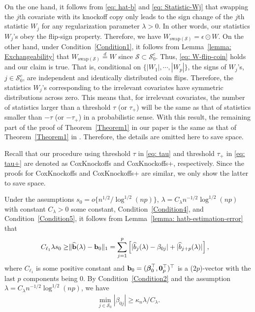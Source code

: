 \documentclass[11pt]{article}
\def\bb{{\bf b}}
\def\0{{\bf 0}}
\newcommand{\bbeta}{\mbox{\boldmath $\beta$}}
\begin{document}
On the one hand, it follows from \eqref{eq: hat-b} and \eqref{eq: Statistic-Wj} that swapping the $j$th covariate with its knockoff copy only leads to the sign change of the $j$th statistic $W_j$ for any regularization parameter $\lambda>0$. In other words, our statistics $W_j$'s obey the flip-sign property. Therefore, we have $ W_{\mathrm{swap}(\mathcal{S})}=\epsilon \odot W$. On the other hand, under Condition~\ref{Condition1},  it follows from Lemma~\ref{lemma: Exchangeability} that $W_{\mathrm{swap}(\mathcal{S})} \overset{d}= W$ since $\mathcal{S}\subset \mathcal{S}_{0}^c$. Thus, \eqref{eq: W-flip-coin} holds and our claim is true. That is, conditional on $\{|W_1|, \cdots, |W_p|\}$,  the signs of $W_j$'s, $j\in \mathcal{S}_0^c$, are independent and identically distributed coin flips. Therefore, the statistics $W_j$'s corresponding to the irrelevant covariates have symmetric distributions across zero. This means that, for irrelevant covariates, the number of statistics larger than a threshold $\tau$ (or $\tau_{+}$) will be the same as that of statistics smaller than $-\tau$ (or $-\tau_{+}$) in a probabilistic sense. With this result, the remaining part of the proof of Theorem~\ref{Theorem1} in our paper is the same as that of Theorem~\ref{Theorem1} in \cite{candes2018panning}. Therefore, the details are omitted here to save space.



\vspace{8mm}
Recall that our procedure
using threshold $\tau$ in \eqref{eq: tau} and threshold $\tau_{+}$ in \eqref{eq: tau+} are denoted as CoxKnockoffs and CoxKnockoffs+, respectively.  Since the proofs for CoxKnockoffs and CoxKnockoffs+ are similar,  we only show the latter to save space. 

Under the assumptions  $s_0=o\{n^{1/2}/\log^{1/2}(np)\}$,  $\lambda=C_{\lambda}n^{-1/2}\log^{1/2}(np)$ with constant $C_{\lambda}>0$ some constant,  Condition~\ref{Condition4}, and Condition~\ref{Condition5}, it follows from Lemma~\ref{lemma: hatb-estimation-error} that 
\begin{align}\label{eq: oracle-inequality-beta} 
C_{\ell_1}\lambda s_0
\geq & \|\widehat{\bb}(\lambda)-\bb_0\|_1
=\sum_{j=1}^p\left[|\widehat{b}_j(\lambda)-\beta_{0j}|+ |\widehat{b}_{j+p}(\lambda)|\right],
\end{align}    
where $C_{\ell_1}$ is some positive constant %
and $\bb_0=(\bbeta_0^{\top}, \0_p^{\top})^{\top}$ is a ($2p$)-vector with the last $p$ components being 0. By Condition~\ref{Condition2} and the assumption  
$\lambda=C_{\lambda}n^{-1/2}\log^{1/2}(np)$,
we have
\begin{align}\label{eq: min-beta}
\min_{j\in\mathcal{S}_0}|\beta_{0j}|\geq \kappa_n\lambda/C_{\lambda}.
\end{align}
\end{document}
